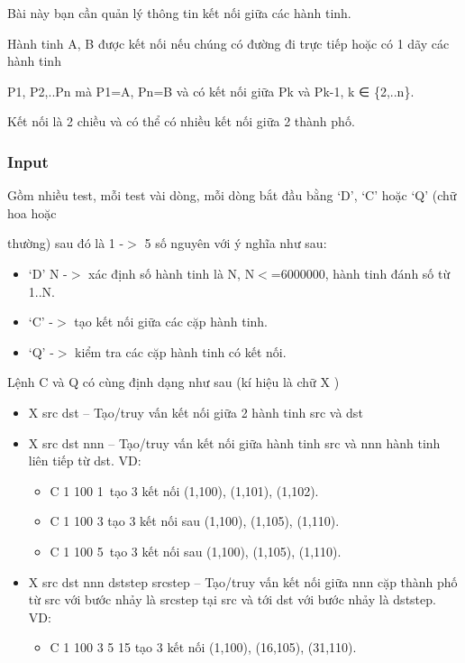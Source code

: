 

Bài này bạn cần quản lý thông tin kết nối giữa các hành tinh.

Hành tinh A, B được kết nối nếu chúng có đường đi trực tiếp hoặc có 1 dãy các hành tinh

P1, P2,..Pn mà P1=A, Pn=B và có kết nối giữa Pk và Pk-1, k ∈ \{2,..n\}.

Kết nối là 2 chiều và có thể có nhiều kết nối giữa 2 thành phố.

\subsubsection{Input}

Gồm nhiều test, mỗi test vài dòng, mỗi dòng bắt đầu bằng ‘D’, ‘C’ hoặc ‘Q’ (chữ hoa hoặc

thường) sau đó là 1 -$>$ 5 số nguyên với ý nghĩa như sau:
\begin{itemize}
	\item ‘D’ N -$>$ xác định số hành tinh là N, N$<$=6000000, hành tinh đánh số từ 1..N.
	\item ‘C’ -$>$ tạo kết nối giữa các cặp hành tinh.
	\item ‘Q’ -$>$ kiểm tra các cặp hành tinh có kết nối.
\end{itemize}

Lệnh C và Q có cùng định dạng như sau (kí hiệu là chữ X )
\begin{itemize}
	\item X src dst – Tạo/truy vấn kết nối giữa 2 hành tinh src và dst
	\item X src dst nnn – Tạo/truy vấn kết nối giữa hành tinh src và nnn hành tinh liên tiếp từ dst. VD:
\begin{itemize}
	\item C 1 100 1 tạo 3 kết nối (1,100), (1,101), (1,102).
	\item C 1 100 3 tạo 3 kết nối sau (1,100), (1,105), (1,110).
	\item C 1 100 5 tạo 3 kết nối sau (1,100), (1,105), (1,110).
\end{itemize}
	\item X src dst nnn dststep srcstep – Tạo/truy vấn kết nối giữa nnn cặp thành phố từ src với bước nhảy là srcstep tại src và tới dst với bước nhảy là dststep. VD:
\begin{itemize}
	\item C 1 100 3 5 15 tạo 3 kết nối (1,100), (16,105), (31,110).
\end{itemize}
\end{itemize}

